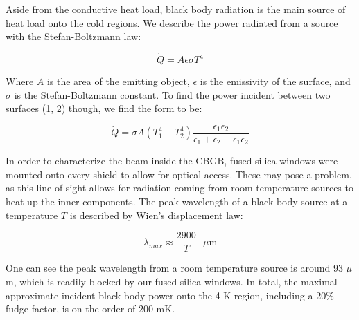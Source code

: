 Aside from the conductive heat load, black body radiation is the main source of heat load onto the cold regions. We describe the power radiated from a source with the Stefan-Boltzmann law:

\begin{equation}
	\dot{Q} = A \epsilon \sigma T^4
\end{equation}

Where $A$ is the area of the emitting object, $\epsilon$ is the emissivity of the surface, and $\sigma$ is the Stefan-Boltzmann constant. To find the power incident between two surfaces (1, 2) though, we find the form to be:

\begin{equation}
	\dot{Q} = \sigma A (T_1^4 - T_2^4)\frac{\epsilon_1 \epsilon_2}{\epsilon_1 + \epsilon_2 - \epsilon_1 \epsilon_2}
\end{equation}

In order to characterize the beam inside the CBGB, fused silica windows were mounted onto every shield to allow for optical access. These may pose a problem, as this line of sight allows for radiation coming from room temperature sources to heat up the inner components. The peak wavelength of a black body source at a temperature $T$ is described by Wien's displacement law:

\begin{equation}
	\lambda_{max} \approx \frac{2900}{T}\text{ $\mu$m}
	\label{eq: BBR peak lambda}
\end{equation}

One can see the peak wavelength from a room temperature source is around 93 $\mu$m, which is readily blocked by our fused silica windows. In total, the maximal approximate incident black body power onto the 4 K region, including a 20\% fudge factor, is on the order of 200 mK.

